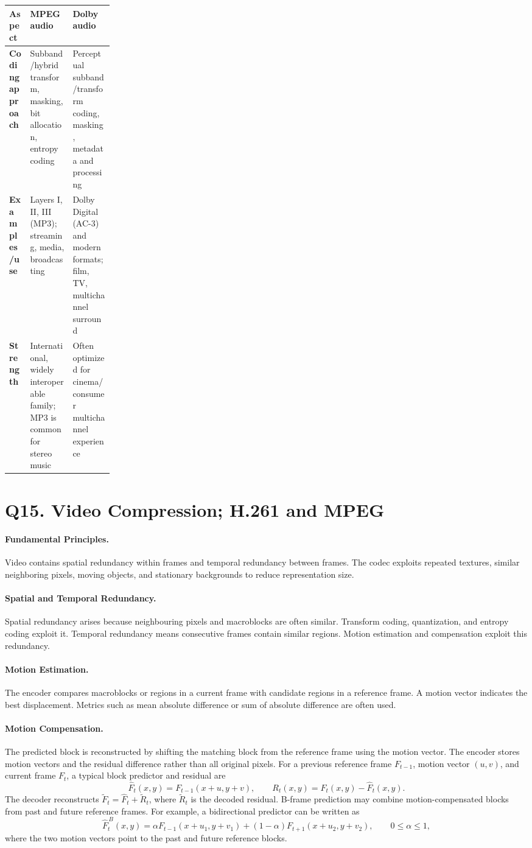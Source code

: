 \documentclass[12pt,a4paper]{article}
\newcommand{\qheading}[1]{\section*{#1}}
\newcommand{\topic}[1]{\paragraph{\color{navy}#1.}}
\begin{document}
\begin{center}
\begin{tabularx}{\linewidth}{>{\bfseries}p{0.2\linewidth}XX}
\toprule
Aspect & MPEG audio & Dolby audio\\
\midrule
Coding approach & Subband/hybrid transform, masking, bit allocation, entropy coding & Perceptual subband/transform coding, masking, metadata and processing\\
Examples/use & Layers I, II, III (MP3); streaming, media, broadcasting & Dolby Digital (AC-3) and modern formats; film, TV, multichannel surround\\
Strength & International, widely interoperable family; MP3 is common for stereo music & Often optimized for cinema/consumer multichannel experience\\
\bottomrule
\end{tabularx}
\end{center}

\clearpage
\qheading{Q15. Video Compression; H.261 and MPEG}

\topic{Fundamental Principles}
Video contains spatial redundancy within frames and temporal redundancy between frames. The codec exploits repeated textures, similar neighboring pixels, moving objects, and stationary backgrounds to reduce representation size.

\topic{Spatial and Temporal Redundancy}
Spatial redundancy arises because neighbouring pixels and macroblocks are often similar. Transform coding, quantization, and entropy coding exploit it. Temporal redundancy means consecutive frames contain similar regions. Motion estimation and compensation exploit this redundancy.

\topic{Motion Estimation}
The encoder compares macroblocks or regions in a current frame with candidate regions in a reference frame. A motion vector indicates the best displacement. Metrics such as mean absolute difference or sum of absolute difference are often used.

\topic{Motion Compensation}
The predicted block is reconstructed by shifting the matching block from the reference frame using the motion vector. The encoder stores motion vectors and the residual difference rather than all original pixels.
For a previous reference frame \(F_{t-1}\), motion vector \((u,v)\), and current frame \(F_t\), a typical block predictor and residual are
\[
\widehat{F}_t(x,y)=F_{t-1}(x+u,y+v),\qquad
R_t(x,y)=F_t(x,y)-\widehat{F}_t(x,y).
\]
The decoder reconstructs \(\widetilde{F}_t=\widehat{F}_t+\widetilde{R}_t\), where \(\widetilde{R}_t\) is the decoded residual. B-frame prediction may combine motion-compensated blocks from past and future reference frames.
For example, a bidirectional predictor can be written as
\[
\widehat{F}^{\,B}_t(x,y)=
\alpha F_{t-1}(x+u_1,y+v_1)
+(1-\alpha)F_{t+1}(x+u_2,y+v_2),
\qquad 0\leq\alpha\leq1,
\]
where the two motion vectors point to the past and future reference blocks.
\end{document}
